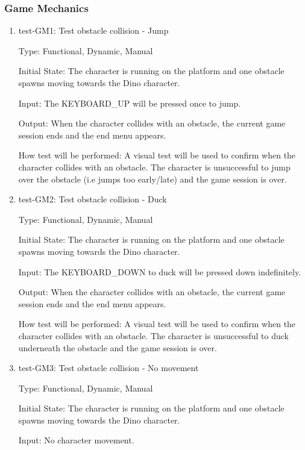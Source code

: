 \documentclass[12pt, titlepage]{article}
\begin{document}
\subsubsection{Game Mechanics}
\begin{enumerate}

\item{test-GM1: Test obstacle collision - Jump\\}

Type: Functional, Dynamic, Manual
					
Initial State: The character is running on the platform and one obstacle spawns moving towards the Dino character.
					
Input: The KEYBOARD\_UP will be pressed once to jump.
					
Output: When the character collides with an obstacle, the current game session ends and the end menu appears.
					
How test will be performed: A visual test will be used to confirm when the character collides with an obstacle. The character is unsuccessful to jump over the obstacle (i.e jumps too early/late) and the game session is over.

\item{test-GM2: Test obstacle collision - Duck\\}

Type: Functional, Dynamic, Manual
					
Initial State: The character is running on the platform and one obstacle spawns moving towards the Dino character.
					
Input: The  KEYBOARD\_DOWN to duck will be pressed down indefinitely.
					
Output: When the character collides with an obstacle, the current game session ends and the end menu appears.
					
How test will be performed: A visual test will be used to confirm when the character collides with an obstacle. The character is unsuccessful to duck underneath the obstacle and the game session is over.

\item{test-GM3: Test obstacle collision - No movement\\}

Type: Functional, Dynamic, Manual
					
Initial State: The character is running on the platform and one obstacle spawns moving towards the Dino character.
					
Input: No character movement.
					

\end{enumerate}
\end{document}
